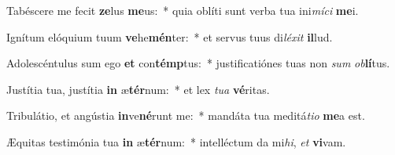 \item Tabéscere me fecit \textbf{ze}lus \textbf{me}us:~* quia oblíti sunt verba tua ini\textit{mí}\textit{ci} \textbf{me}i.
\item Ignítum elóquium tuum \textbf{ve}he\textbf{mén}ter:~* et servus tuus di\textit{lé}\textit{xit} \textbf{il}lud.
\item Adolescéntulus sum ego \textbf{et} con\textbf{témp}tus:~* justificatiónes tuas non \textit{sum} \textit{ob}\textbf{lí}tus.
\item Justítia tua, justítia \textbf{in} æ\textbf{tér}num:~* et lex \textit{tu}\textit{a} \textbf{vé}ritas.
\item Tribulátio, et angústia \textbf{in}ve\textbf{né}runt me:~* mandáta tua meditá\textit{ti}\textit{o} \textbf{me}a est.
\item Æquitas testimónia tua \textbf{in} æ\textbf{tér}num:~* intelléctum da mi\textit{hi}, \textit{et} \textbf{vi}vam.
